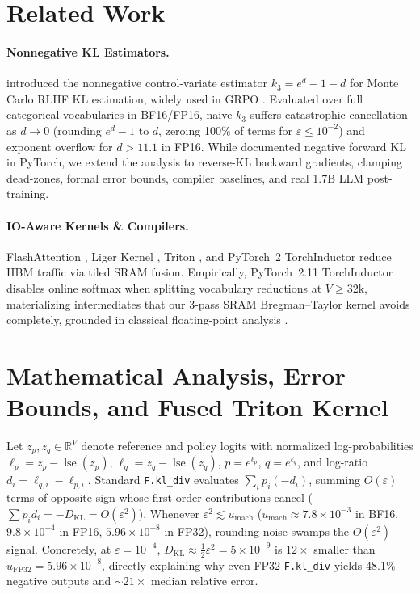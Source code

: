 \documentclass[10pt,twocolumn]{article}
\newcommand{\KL}{D_{\mathrm{KL}}}
\begin{document}
\section{Related Work}
\paragraph{Nonnegative KL Estimators.} \citet{schulman2020kl} introduced the nonnegative control-variate estimator $k_3 = e^d - 1 - d$ for Monte Carlo RLHF KL estimation, widely used in GRPO \citep{shao2024deepseekmath}. Evaluated over full categorical vocabularies in BF16/FP16, naive $k_3$ suffers catastrophic cancellation as $d \to 0$ (rounding $e^d - 1$ to $d$, zeroing 100\% of terms for $\varepsilon \le 10^{-2}$) and exponent overflow for $d > 11.1$ in FP16. While \citet{klnegative2026} documented negative forward KL in PyTorch, we extend the analysis to reverse-KL backward gradients, clamping dead-zones, formal error bounds, compiler baselines, and real 1.7B LLM post-training.
\paragraph{IO-Aware Kernels \& Compilers.} FlashAttention \citep{dao2022flashattention}, Liger Kernel \citep{hsu2024liger}, Triton \citep{tillet2019triton}, and PyTorch~2 TorchInductor \citep{ansel2024pytorch2} reduce HBM traffic via tiled SRAM fusion. Empirically, PyTorch~2.11 TorchInductor disables online softmax when splitting vocabulary reductions at $V \ge 32\text{k}$, materializing intermediates that our 3-pass SRAM Bregman--Taylor kernel avoids completely, grounded in classical floating-point analysis \citep{higham2002accuracy}.

\section{Mathematical Analysis, Error Bounds, and Fused Triton Kernel}
Let $z_p, z_q \in \mathbb{R}^V$ denote reference and policy logits with normalized log-probabilities $\ell_p = z_p - \operatorname{lse}(z_p)$, $\ell_q = z_q - \operatorname{lse}(z_q)$, $p = e^{\ell_p}$, $q = e^{\ell_q}$, and log-ratio $d_i = \ell_{q,i} - \ell_{p,i}$. Standard \texttt{F.kl\_div} evaluates $\sum_i p_i (-d_i)$, summing $O(\varepsilon)$ terms of opposite sign whose first-order contributions cancel ($\sum p_i d_i = -\KL = O(\varepsilon^2)$). Whenever $\varepsilon^2 \lesssim u_{\mathrm{mach}}$ ($u_{\mathrm{mach}} \approx 7.8\times 10^{-3}$ in BF16, $9.8\times 10^{-4}$ in FP16, $5.96\times 10^{-8}$ in FP32), rounding noise swamps the $O(\varepsilon^2)$ signal. Concretely, at $\varepsilon=10^{-4}$, $\KL \approx \frac{1}{2}\varepsilon^2 = 5\times 10^{-9}$ is $12\times$ smaller than $u_{\mathrm{FP32}} = 5.96\times 10^{-8}$, directly explaining why even FP32 \texttt{F.kl\_div} yields 48.1\% negative outputs and $\sim 21\times$ median relative error.
\end{document}
